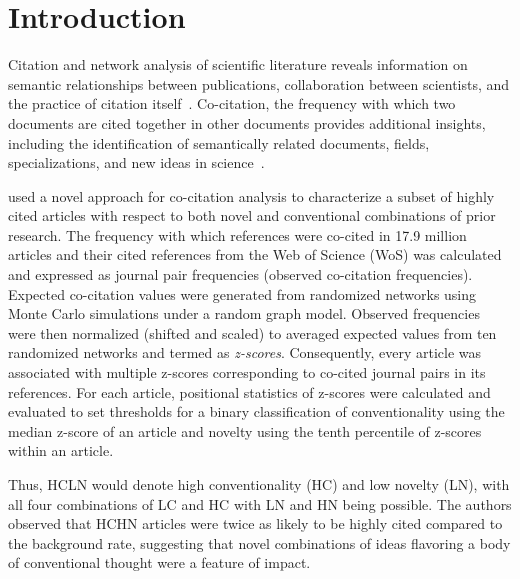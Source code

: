 \documentclass[NETN]{stjour}
\begin{document}
\section{Introduction}

Citation and network analysis of  scientific literature reveals information on semantic relationships between publications, collaboration between scientists, and the practice of citation itself~\citep{garfield_citation_1955,de_solla_price_networks_1965,newman_structure_2001,Shi:2010:CHI:1816123.1816131,patience_pmid28560354}. Co-citation, the frequency with which two documents are cited together in other documents provides additional insights, including the identification of semantically related documents, fields, specializations, and new ideas in science~\citep{small_co-citation_1973, marshakova-shaikevich_co-citation_1973,boyack_co-citation_2010, 10.3389/frma.2018.00020}. 

\cite{uzzi_atypical_2013} used a novel approach for co-citation analysis to characterize a subset of highly cited articles with respect to both novel and conventional combinations of prior research. The frequency with which references were co-cited  in 17.9 million articles and their cited references from the Web of Science (WoS) was calculated and expressed as journal pair frequencies (observed co-citation frequencies). Expected co-citation values were generated from randomized networks using Monte Carlo simulations under a random graph model. Observed frequencies were then normalized (shifted and scaled) to averaged expected values from ten randomized networks and termed as \emph{z-scores}. Consequently, every article was associated with multiple z-scores corresponding to co-cited journal pairs in its references. For each article, positional statistics of z-scores were calculated and evaluated to set thresholds for a binary classification of conventionality using the median z-score of an article and novelty using the tenth percentile of z-scores within an article.

Thus, HCLN would denote high conventionality (HC) and low novelty (LN), with all four combinations of LC and HC with LN and HN being possible. The authors observed that HCHN articles were twice as likely to be highly cited compared to the background rate, suggesting that novel combinations of ideas flavoring a body of conventional thought were a feature of impact. 
\end{document}
